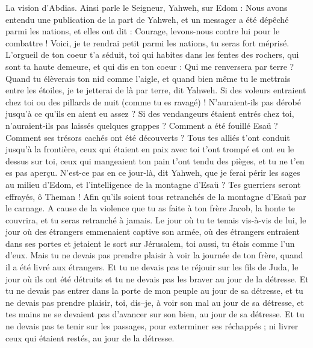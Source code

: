 \begin{multicols}{2}
\VerseOne{}La vision d'Abdias. Ainsi parle le Seigneur, Yahweh, sur Edom : Nous avons entendu une publication de la part de Yahweh, et un messager a été dépêché parmi les nations, et elles ont dit : Courage, levons-nous contre lui pour le combattre !
Voici, je te rendrai petit parmi les nations, tu seras fort méprisé.
L'orgueil de ton coeur t'a séduit, toi qui habites dans les fentes des rochers, qui sont ta haute demeure, et qui dis en ton coeur : Qui me renversera par terre ?
Quand tu élèverais ton nid comme l'aigle, et quand bien même tu le mettrais entre les étoiles, je te jetterai de là par terre, dit Yahweh.
Si des voleurs entraient chez toi ou des pillards de nuit (comme tu es ravagé) ! N’auraient-ils pas dérobé jusqu’à ce qu’ils en aient eu assez ? Si des vendangeurs étaient entrés chez toi, n’auraient-ils pas laissés quelques grappes ?
Comment a été fouillé Esaü ? Comment ses trésors cachés ont été découverts ?
Tous tes alliés t'ont conduit jusqu'à la frontière, ceux qui étaient en paix avec toi t'ont trompé et ont eu le dessus sur toi, ceux qui mangeaient ton pain t'ont tendu des pièges, et tu ne t'en es pas aperçu.
N'est-ce pas en ce jour-là, dit Yahweh, que je ferai périr les sages au milieu d'Edom, et l'intelligence de la montagne d'Esaü ?
Tes guerriers seront effrayés, ô Theman ! Afin qu'ils soient tous retranchés de la montagne d'Esaü par le carnage.
A cause de la violence que tu as faite à ton frère Jacob, la honte te couvrira, et tu seras retranché à jamais.
Le jour où tu te tenais vis-à-vis de lui, le jour où des étrangers emmenaient captive son armée, où des étrangers entraient dans ses portes et jetaient le sort sur Jérusalem, toi aussi, tu étais comme l'un d'eux.
Mais tu ne devais pas prendre plaisir à voir la journée de ton frère, quand il a été livré aux étrangers. Et tu ne devais pas te réjouir sur les fils de Juda, le jour où ils ont été détruits et tu ne devais pas les braver au jour de la détresse.
Et tu ne devais pas entrer dans la porte de mon peuple au jour de sa détresse, et tu ne devais pas prendre plaisir, toi, dis–je, à voir son mal au jour de sa détresse, et tes mains ne se devaient pas d'avancer sur son bien, au jour de sa détresse.
Et tu ne devais pas te tenir sur les passages, pour exterminer ses réchappés ; ni livrer ceux qui étaient restés, au jour de la détresse.

\end{multicols}
